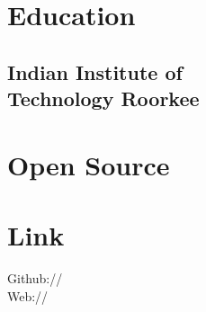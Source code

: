 \documentclass[]{deedy-resume-openfont}
\begin{document}
\begin{minipage}[t]{0.33\textwidth}


\section{Education}


\subsection{Indian Institute of \\ Technology Roorkee}
\sectionsep


\section{Open Source}
    \textbullet{} \href{https://github.com/lfortran/lfortran}{} \textbullet{} \href{https://github.com/sympy/sympy}{} \textbullet{} \href{https://fluxml.ai/Flux.jl}{} \textbullet{} \href{http://scikit-learn.org/}{} \textbullet{} \href{http://mpmath.org/}{}


\section{Link}
Github:// \href{https://github.com/gxyd}{} \\
Web:// \href{https://gxyd.github.io}{} \\
\sectionsep


\end{minipage}
\end{document}
